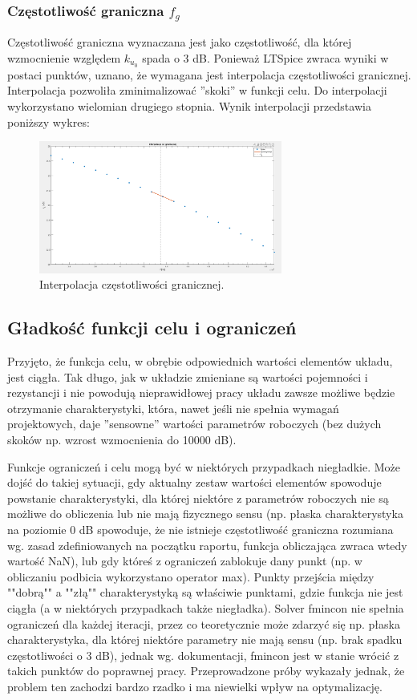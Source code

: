 \documentclass{article}
\begin{document}
\subsubsection*{Częstotliwość graniczna $f_g$}
Częstotliwość graniczna wyznaczana jest jako częstotliwość, dla której wzmocnienie względem $k_{u{_0}}$ spada o 3 dB.
Ponieważ LTSpice zwraca wyniki w postaci punktów, uznano, że wymagana jest interpolacja częstotliwości granicznej. Interpolacja pozwoliła zminimalizować ''skoki'' w funkcji celu. Do interpolacji wykorzystano wielomian drugiego stopnia. Wynik interpolacji przedstawia poniższy wykres:
\begin{figure}[h]
    \includegraphics[width=8cm]{graphics/fg_interp.png}
    \centering
    \caption{Interpolacja częstotliwości granicznej.}
\end{figure}



\subsection{Gładkość funkcji celu i ograniczeń}
Przyjęto, że funkcja celu, w obrębie odpowiednich wartości elementów układu, jest ciągła. Tak długo, jak w układzie zmieniane są wartości pojemności i rezystancji i
nie powodują nieprawidłowej pracy układu zawsze możliwe będzie otrzymanie charakterystyki, która, nawet jeśli nie spełnia wymagań projektowych, daje ''sensowne'' wartości parametrów roboczych (bez dużych skoków
np. wzrost wzmocnienia do 10000 dB).

Funkcje ograniczeń i celu mogą być w niektórych przypadkach niegładkie. Może dojść do takiej sytuacji, gdy aktualny zestaw wartości elementów spowoduje powstanie charakterystyki,
dla której niektóre z parametrów roboczych nie są możliwe do obliczenia lub nie mają fizycznego sensu (np. płaska charakterystyka na poziomie 0 dB spowoduje, że nie istnieje częstotliwość graniczna rozumiana wg. zasad zdefiniowanych
na początku raportu, funkcja obliczająca zwraca wtedy wartość NaN), lub gdy któreś z ograniczeń zablokuje dany punkt (np. w obliczaniu podbicia wykorzystano operator max). 
Punkty przejścia między ""dobrą"" a ""złą"" charakterystyką są właściwie punktami, gdzie funkcja nie jest ciągła (a w niektórych przypadkach także niegładka). Solver fmincon nie spełnia ograniczeń dla każdej iteracji, przez co teoretycznie może zdarzyć się np. płaska charakterystyka,
dla której niektóre parametry nie mają sensu (np. brak spadku częstotliwości o 3 dB), jednak wg. dokumentacji, fmincon jest w stanie wrócić z takich punktów do poprawnej pracy. Przeprowadzone próby wykazały jednak, że problem ten zachodzi bardzo rzadko i ma niewielki wpływ na optymalizację.
\end{document}
